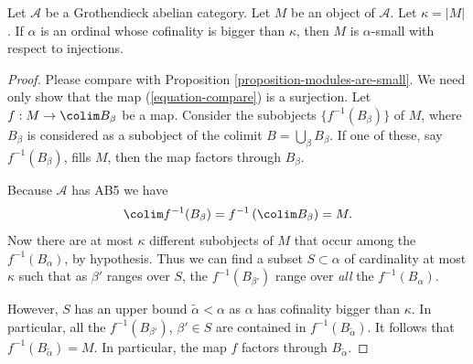 \begin{proposition}
\label{proposition-objects-are-small}
Let $\mathcal{A}$ be a Grothendieck abelian category. Let $M$ be an
object of $\mathcal{A}$. Let $\kappa = |M|$.
If $\alpha$ is an ordinal whose cofinality is bigger than $\kappa$,
then $M$ is $\alpha$-small with respect to injections.
\end{proposition}

\begin{proof}
Please compare with Proposition \ref{proposition-modules-are-small}.
We need only show that the map (\ref{equation-compare}) is a surjection.
Let $f : M \to \colim B_\beta$ be a map.
Consider the subobjects $\{f^{-1}(B_\beta)\}$ of $M$, where $B_\beta$
is considered as a subobject of the colimit $B = \bigcup_\beta B_\beta$.
If one of these, say $f^{-1}(B_\beta)$, fills $M$,
then the map factors through $B_\beta$.

\medskip\noindent
Because $\mathcal{A}$ has AB5 we have
$$
\colim f^{-1}(B_\beta) = f^{-1}\left(\colim B_\beta\right) = M.
$$
Now there are at most $\kappa$ different subobjects of $M$ that occur among
the $f^{-1}(B_\alpha)$, by hypothesis.
Thus we can find a subset $S \subset \alpha$ of cardinality at most
$\kappa$ such that as $\beta'$ ranges over $S$, the
$f^{-1}(B_{\beta'})$ range over \emph{all} the $f^{-1}(B_\alpha)$.

\medskip\noindent
However, $S$ has an upper bound $\widetilde{\alpha} < \alpha$ as
$\alpha$ has cofinality bigger than $\kappa$. In particular, all the
$f^{-1}(B_{\beta'})$, $\beta' \in S$ are contained in
$f^{-1}(B_{\widetilde{\alpha}})$.
It follows that $f^{-1}(B_{\widetilde{\alpha}}) = M$.
In particular, the map $f$ factors through $B_{\widetilde{\alpha}}$.
\end{proof}
